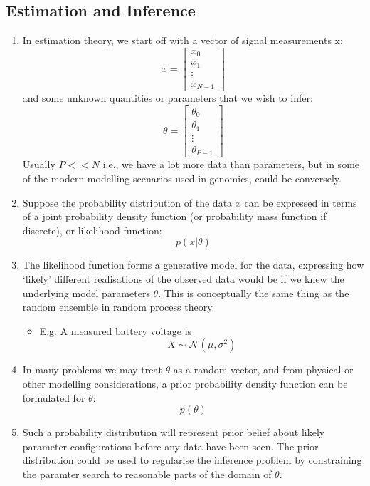 \documentclass[12pt]{article}
\newcommand{\sigd}{\sigma^2}
\newcommand{\gau}{\mathcal{N}}
\begin{document}
\subsection{Estimation and Inference}
\begin{enumerate}
    \item In estimation theory, we start off with a vector of signal measurements x:
    \[
    x = \begin{bmatrix}
    x_0 \\
    x_1 \\
    \vdots \\
    x_{N-1}
    \end{bmatrix}
    \]
    and some unknown quantities or parameters that we wish to infer:
    \[
    \theta = \begin{bmatrix}
    \theta_0 \\
    \theta_1 \\
    \vdots \\
    \theta_{P-1}
    \end{bmatrix}
    \]
    Usually $P << N$ i.e., we have a lot more data than parameters, but in some of the modern modelling scenarios used in genomics, could be conversely.
    \item Suppose the probability distribution of the data $x$ can be expressed in terms of a joint probability density function (or probability mass function if discrete), or likelihood function:
    \[
    p(x|\theta)
    \]
    \item The likelihood function forms a generative model for the data, expressing how `likely' different realisations of the observed data would be if we knew the underlying model parameters $\theta$. This is conceptually the same thing as the random ensemble in random process theory.
    \begin{itemize}
        \item E.g. A measured battery voltage is 
        \[
        X \sim \gau(\mu, \sigd)
        \]
    \end{itemize}
    \item In many problems we may treat $\theta $ as a random vector, and from physical or other modelling considerations, a prior probability density function can be formulated for $\theta$:
    \[
    p(\theta)
    \]
    \item Such a probability distribution will represent prior belief about likely parameter configurations before any data have been seen. The prior distribution could be used to regularise the inference problem by constraining the paramter search to reasonable parts of the domain of $\theta$.

\end{enumerate}
\end{document}
